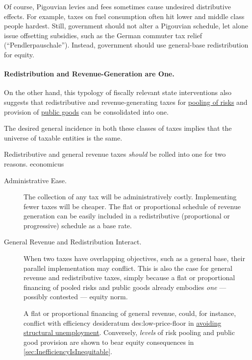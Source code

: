 Of course, Pigouvian levies and fees sometimes cause undesired distributive effects.
For example, taxes on fuel consumption often hit lower and middle class people hardest.
Still, government should not alter a Pigouvian schedule, let alone issue offsetting subsidies, such as the German commuter tax relief (``Pendlerpauschale'').
Instead, government should use general-base redistribution for equity.

\paragraph{Redistribution and Revenue-Generation are One.}
	\label{sec:fiscal-redistributionAndRevenueAreOne}
On the other hand, this typology of fiscally relevant state interventions also suggests that redistributive and revenue-generating taxes for \hyperref[sec:state-insurance]{pooling of risks} and provision of \hyperref[sec:public-good-response]{public goods} can be consolidated into one.

The desired general incidence in both these classes of taxes implies that the universe of taxable entities is the same.

Redistributive and general revenue taxes \emph{should} be rolled into one for two reasons.
economicus
\begin{description}
	\item[Administrative Ease.]
	The collection of any tax will be administratively costly.
	Implementing fewer taxes will be cheaper.
	The flat or proportional schedule of revenue generation can be easily included in a redistributive (proportional or progressive) schedule as a base rate.

	\item[General Revenue and Redistribution Interact.]
	When two taxes have overlapping objectives, such as a general base, their parallel implementation may conflict.
	This is also the case for general revenue and redistributive taxes, simply because a flat or proportional financing of pooled risks and public goods already embodies \emph{one} --- possibly contested --- equity norm.

	A flat or proportional financing of general revenue, could, for instance, conflict with efficiency desideratum	{des:low-price-floor} in \hyperref[des:low-price-floor]{avoiding structural unemployment}.
	Conversely, \emph{levels} of risk pooling and public good provision are shown to bear equity consequences in \autoref{sec:InefficiencyIsInequitable}.
\end{description}

